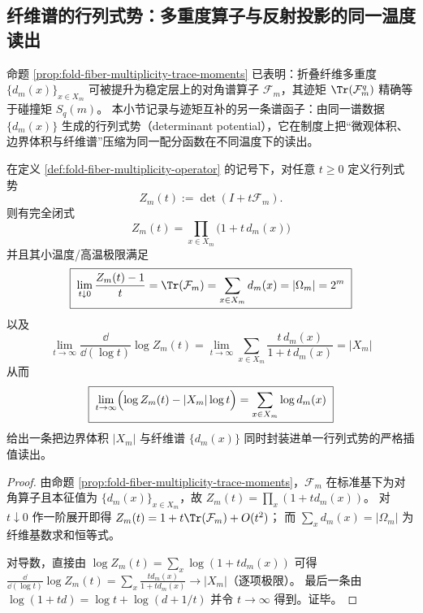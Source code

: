 
\subsection{纤维谱的行列式势：多重度算子与反射投影的同一温度读出}\label{subsec:op-algebra-fiber-determinant-potentials}
命题 \ref{prop:fold-fiber-multiplicity-trace-moments} 已表明：折叠纤维多重度 \(\{d_m(x)\}_{x\in X_m}\) 可被提升为稳定层上的对角谱算子 \(\mathcal{F}_m\)，其迹矩 \(\Tr(\mathcal{F}_m^q)\) 精确等于碰撞矩 \(S_q(m)\)。
本小节记录与迹矩互补的另一条谱函子：由同一谱数据 \(\{d_m(x)\}\) 生成的行列式势（determinant potential），它在制度上把“微观体积、边界体积与纤维谱”压缩为同一配分函数在不同温度下的读出。

\begin{proposition}[纤维谱配分函数：\texorpdfstring{$Z_m(t)=\det(I+t\mathcal{F}_m)$}{Zm(t)=det(I+tF)} 的闭式与两端读出]\label{prop:op-algebra-fiber-spectrum-determinant-partition}
在定义 \ref{def:fold-fiber-multiplicity-operator} 的记号下，对任意 \(t\ge 0\) 定义行列式势
\[
Z_m(t):=\det(I+t\mathcal{F}_m).
\]
则有完全闭式
\[
\boxed{\;
Z_m(t)=\prod_{x\in X_m}\bigl(1+t\,d_m(x)\bigr)\;}
\]
并且其小温度/高温极限满足
\[
\boxed{\;
\lim_{t\downarrow 0}\frac{Z_m(t)-1}{t}=\Tr(\mathcal{F}_m)=\sum_{x\in X_m}d_m(x)=|\Omega_m|=2^m\;}
\]
以及
\[
\boxed{\;
\lim_{t\to\infty}\frac{\dd}{\dd(\log t)}\log Z_m(t)
=\lim_{t\to\infty}\sum_{x\in X_m}\frac{t\,d_m(x)}{1+t\,d_m(x)}
=|X_m|\;}
\]
从而
\[
\boxed{\;
\lim_{t\to\infty}\Bigl(\log Z_m(t)-|X_m|\log t\Bigr)=\sum_{x\in X_m}\log d_m(x)\;}
\]
给出一条把边界体积 \(|X_m|\) 与纤维谱 \(\{d_m(x)\}\) 同时封装进单一行列式势的严格插值读出。
\end{proposition}
\begin{proof}
由命题 \ref{prop:fold-fiber-multiplicity-trace-moments}，\(\mathcal{F}_m\) 在标准基下为对角算子且本征值为 \(\{d_m(x)\}_{x\in X_m}\)，故
\(
Z_m(t)=\prod_x(1+t d_m(x))
\)。
对 \(t\downarrow 0\) 作一阶展开即得
\(
Z_m(t)=1+t\Tr(\mathcal{F}_m)+O(t^2)
\)；
而 \(\sum_x d_m(x)=|\Omega_m|\) 为纤维基数求和恒等式。
\par
对导数，直接由
\(
\log Z_m(t)=\sum_x \log(1+t d_m(x))
\)
可得
\(
\frac{\dd}{\dd(\log t)}\log Z_m(t)=\sum_x \frac{t d_m(x)}{1+t d_m(x)}
\to |X_m|
\)（逐项极限）。
最后一条由 \(\log(1+t d)=\log t+\log(d+1/t)\) 并令 \(t\to\infty\) 得到。证毕。
\end{proof}

